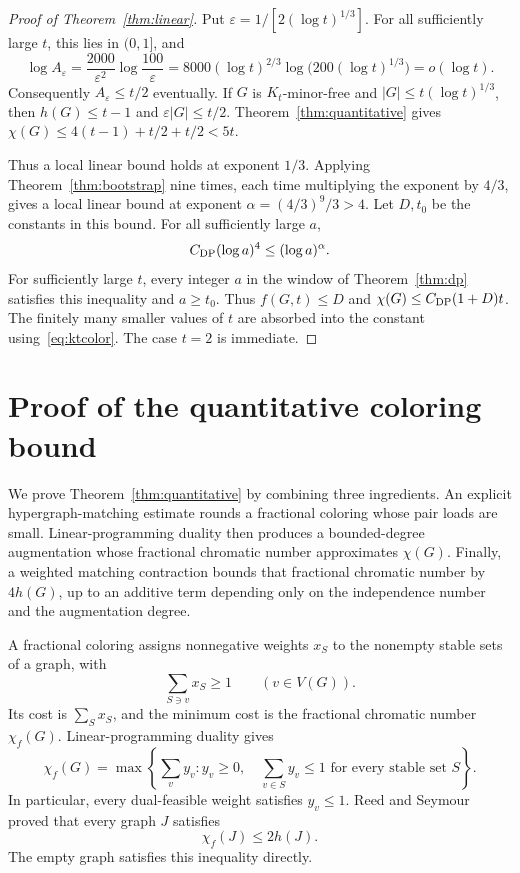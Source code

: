 \documentclass[11pt]{article}
\begin{document}
\begin{proof}[Proof of Theorem~\ref{thm:linear}]
Put $\varepsilon=1/[2(\log t)^{1/3}]$. For all sufficiently large $t$,
this lies in $(0,1]$, and
\[
 \log A_\varepsilon
 =\frac{2000}{\varepsilon^2}\log\frac{100}{\varepsilon}
 =8000(\log t)^{2/3}\log\bigl(200(\log t)^{1/3}\bigr)
 =o(\log t).
\]
Consequently $A_\varepsilon\le t/2$ eventually. If $G$ is $K_t$-minor-free
and $|G|\le t(\log t)^{1/3}$, then $h(G)\le t-1$ and
$\varepsilon|G|\le t/2$. Theorem~\ref{thm:quantitative} gives
$\chi(G)\le4(t-1)+t/2+t/2<5t$.

Thus a local linear bound holds at exponent $1/3$. Applying
Theorem~\ref{thm:bootstrap} nine times, each time multiplying the
exponent by $4/3$, gives a local linear bound at exponent
$\alpha=(4/3)^9/3>4$.
Let $D,t_0$ be the constants in this bound. For all sufficiently
large $a$,
\[
 C_{\rm DP}(\log a)^4\le(\log a)^\alpha.
\]
For sufficiently large $t$, every integer $a$ in the window of
Theorem~\ref{thm:dp} satisfies this inequality and $a\ge t_0$.
Thus $f(G,t)\le D$ and $\chi(G)\le C_{\rm DP}(1+D)t$.
The finitely many smaller values of $t$ are absorbed into the constant
using~\eqref{eq:ktcolor}. The case $t=2$
is immediate.
\end{proof}

\section{Proof of the quantitative coloring bound}\label{sec:quantitative}

We prove Theorem~\ref{thm:quantitative} by combining three ingredients.
An explicit hypergraph-matching estimate rounds a fractional coloring
whose pair loads are small. Linear-programming duality then produces
a bounded-degree augmentation whose fractional chromatic number
approximates $\chi(G)$. Finally, a weighted matching contraction
bounds that fractional chromatic number by $4h(G)$, up to an additive
term depending only on the independence number and the augmentation
degree.

A fractional coloring assigns nonnegative weights $x_S$ to the
nonempty stable sets of a graph, with
\[
\sum_{S\ni v}x_S\ge1\qquad(v\in V(G)).
\]
Its cost is $\sum_Sx_S$, and the minimum cost is the fractional
chromatic number $\chi_f(G)$. Linear-programming duality gives
\begin{equation}\label{eq:dual}
\chi_f(G)=\max\left\{\sum_vy_v:
 y_v\ge0,\quad \sum_{v\in S}y_v\le1
 \text{ for every stable set }S\right\}.
\end{equation}
In particular, every dual-feasible weight satisfies $y_v\le1$.
Reed and Seymour~\cite[Theorem~1.3]{RS} proved that every graph $J$
satisfies
\begin{equation}\label{eq:RS}
\chi_f(J)\le2h(J).
\end{equation}
The empty graph satisfies this inequality directly.
\end{document}
